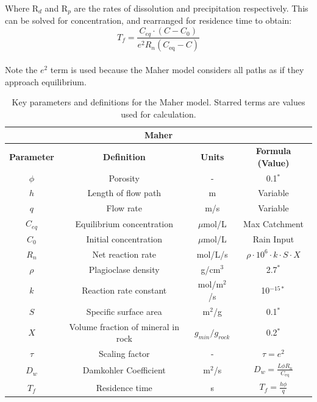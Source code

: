 Where R$_d$ and R$_p$ are the rates of dissolution and precipitation respectively. This can be solved for concentration, and rearranged for residence time to obtain:\\

\begin{equation}
    T_f = \frac{C_{eq} \cdot \left(C - C_0\right)}{e^2 R_n \left( C_{\text{eq}} - C \right)}
\end{equation}\\

Note the $e^2$ term is used because the Maher model considers all paths as if they approach equilibrium.

\begin{table}[H]
    \centering
    \renewcommand{\arraystretch}{1.3} %
    \begin{tabular}{|c|c|c|c|}
        \hline  %
        \multicolumn{4}{|c|}{\textbf{Maher}} \\  
        \hline
        \textbf{Parameter} & \textbf{Definition} & \textbf{Units} & \textbf{Formula (Value)} \\
        \hline
        $\phi$ & Porosity & - & 0.1$^*$ \\
        $h$ & Length of flow path & m & Variable \\
        $q$ & Flow rate & m/s & Variable \\
        $C_{eq}$ & Equilibrium concentration & $\mu$mol/L & Max Catchment \\
        $C_0$ & Initial concentration & $\mu$mol/L & Rain Input \\
        $R_n$ & Net reaction rate & mol/L/s & $\rho \cdot 10^6 \cdot k \cdot S \cdot X $ \\
        $\rho$ & Plagioclase density & g/cm$^3$ & 2.7$^*$ \\
        $k$ & Reaction rate constant & mol/m$^2$/s & 10$^{-15*}$ \\
        $S$ & Specific surface area & m$^2$/g & 0.1$^*$ \\
        $X$ & Volume fraction of mineral in rock & $g_{min}/g_{rock}$& 0.2$^*$ \\
        $\tau$ & Scaling factor & - & $\tau = e^2$ \\
        $D_w$ & Damkohler Coefficient & m$^2$/s & $D_w = \frac{L \phi R_n}{C_{\text{eq}}}$ \\
        $T_f$ & Residence time & s & $T_f = \frac{h \phi}{q}$ \\
        \hline
    \end{tabular}
    \caption{Key parameters and definitions for the Maher model. Starred terms are values used for calculation.}
    \label{tab:parameters2}
\end{table}

